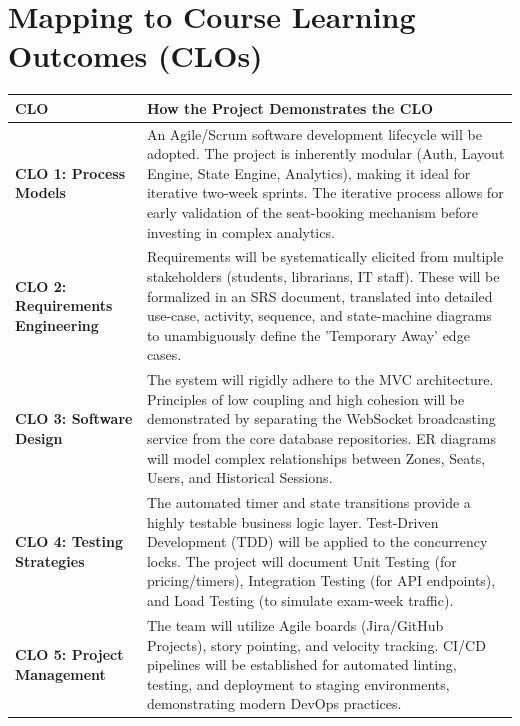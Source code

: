 \documentclass[11pt,a4paper]{article}
\begin{document}
\section{Mapping to Course Learning Outcomes (CLOs)}
\begin{longtable}{p{}p{}}
\toprule
\textbf{CLO} & \textbf{How the Project Demonstrates the CLO} \\
\midrule
\textbf{CLO 1: Process Models} &
An Agile/Scrum software development lifecycle will be adopted. The project is inherently modular (Auth, Layout Engine, State Engine, Analytics), making it ideal for iterative two-week sprints. The iterative process allows for early validation of the seat-booking mechanism before investing in complex analytics. \\

\textbf{CLO 2: Requirements Engineering} &
Requirements will be systematically elicited from multiple stakeholders (students, librarians, IT staff). These will be formalized in an SRS document, translated into detailed use-case, activity, sequence, and state-machine diagrams to unambiguously define the 'Temporary Away' edge cases. \\

\textbf{CLO 3: Software Design} &
The system will rigidly adhere to the MVC architecture. Principles of low coupling and high cohesion will be demonstrated by separating the WebSocket broadcasting service from the core database repositories. ER diagrams will model complex relationships between Zones, Seats, Users, and Historical Sessions. \\

\textbf{CLO 4: Testing Strategies} &
The automated timer and state transitions provide a highly testable business logic layer. Test-Driven Development (TDD) will be applied to the concurrency locks. The project will document Unit Testing (for pricing/timers), Integration Testing (for API endpoints), and Load Testing (to simulate exam-week traffic). \\

\textbf{CLO 5: Project Management} &
The team will utilize Agile boards (Jira/GitHub Projects), story pointing, and velocity tracking. CI/CD pipelines will be established for automated linting, testing, and deployment to staging environments, demonstrating modern DevOps practices. \\

\bottomrule
\end{longtable}
\end{document}

